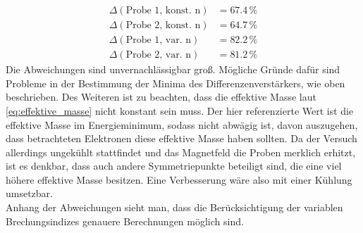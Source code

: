 \begin{align*}
    \Delta(\text{Probe 1, konst. n}) &= 67.4 \, \% \\
    \Delta(\text{Probe 2, konst. n}) &= 64.7 \, \% \\
    \Delta(\text{Probe 1, var. n})   &= 82.2 \, \% \\
    \Delta(\text{Probe 2, var. n})   &= 81.2 \, \% 
\end{align*}
Die Abweichungen sind unvernachlässigbar groß. Mögliche Gründe dafür sind Probleme in der Bestimmung der Minima des Differenzenverstärkers, wie oben beschrieben.
Des Weiteren ist zu beachten, dass die effektive Masse laut \autoref{eq:effektive_masse} nicht konstant sein muss. Der hier referenzierte Wert
ist die effektive Masse im Energieminimum, sodass nicht abwägig ist, davon auszugehen, dass betrachteten Elektronen diese effektive Masse haben sollten. Da der Versuch allerdings ungekühlt stattfindet und das Magnetfeld
die Proben merklich erhitzt, ist es denkbar, dass auch andere Symmetriepunkte beteiligt sind, die eine viel höhere effektive Masse besitzen. Eine Verbesserung wäre also mit einer Kühlung umsetzbar.\\
Anhang der Abweichungen sieht man, dass die Berücksichtigung der variablen Brechungsindizes genauere Berechnungen möglich sind.

